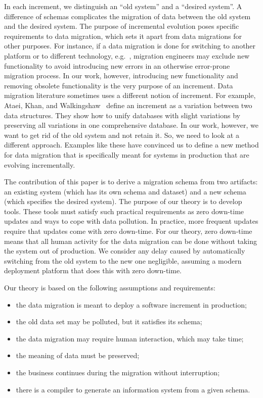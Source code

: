 \documentclass{elsarticle}
\begin{document}
   In each increment, we distinguish an ``old system'' and a ``desired system''.
   A difference of schemas complicates the migration of data between the old system and the desired system.
   The purpose of incremental evolution poses specific requirements to data migration,
   which sets it apart from data migrations for other purposes.
   For instance, if a data migration is done for switching to another platform or to different technology,
   e.g.~\cite{Gholami2016,Bisbal1999},
   migration engineers may exclude new functionality to avoid introducing new errors in an otherwise error-prone migration process.
   In our work, however, introducing new functionality and removing obsolete functionality is the very purpose of an increment.
   Data migration literature sometimes uses a different notion of increment.
   For example, Ataei, Khan, and Walkingshaw~\cite{Ataei2021,Walkingshaw2014} define an increment as a variation between two data structures.
   They show how to unify databases with slight variations by preserving all variations in one comprehensive database.
   In our work, however, we want to get rid of the old system and not retain it.
   So, we need to look at a different approach.
   Examples like these have convinced us to define a new method for data migration that is specifically meant for systems in production that are
   evolving incrementally.
   
   The contribution of this paper is to derive a migration schema from two artifacts: an existing system
   (which has its own schema and dataset) and a new schema (which specifies the desired system).
   The purpose of our theory is to develop tools.
   These tools must satisfy such practical requirements as
   zero down-time updates and ways to cope with data pollution.
   In practice, more frequent updates require that updates come with zero down-time.
   For our theory, zero down-time means that all human activity for the data migration can be done without taking the system out of production.
   We consider any delay caused by automatically switching from the old system to the new one negligible,
   assuming a modern deployment platform that does this with zero down-time.
   
   Our theory is based on the following assumptions and requirements:
\begin{itemize}
   \item the data migration is meant to deploy a software increment in production;
   \item the old data set may be polluted, but it satisfies its schema;
   \item the data migration may require human interaction, which may take time;
   \item the meaning of data must be preserved;
   \item the business continues during the migration without interruption;
   \item there is a compiler to generate an information system from a given schema.
\end{itemize}
\end{document}
